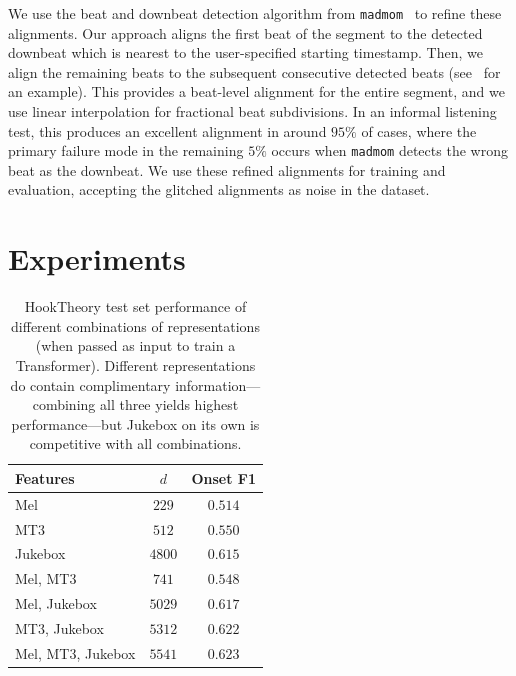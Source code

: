 \documentclass{article}
\newcommand{\madmom}{\texttt{madmom}}
\newcommand{\mel}{Mel}
\newcommand{\mtthree}{MT3}
\newcommand{\jukebox}{Jukebox}
\newcommand{\hooktheory}{HookTheory}
\newcommand{\fone}{F1}
\begin{document}
We use the beat and downbeat detection algorithm from \madmom{}~\cite{bock2016joint,bock2016madmom} to refine these alignments. 
Our approach aligns the first beat of the segment to the detected downbeat which is nearest to the user-specified starting timestamp. 
Then, we align the remaining beats to the subsequent consecutive detected beats (see~ for an example). 
This provides a beat-level alignment for the entire segment, and we use linear interpolation for fractional beat subdivisions. 
In an informal listening test, this produces an excellent alignment in around $95\%$ of cases, where the primary failure mode in the remaining $5\%$ occurs when \madmom{} detects the wrong beat as the downbeat. 
We use these refined alignments for training and evaluation, accepting the glitched alignments as noise in the dataset.

\section{Experiments}

\begin{table}[]
    \centering
    \begin{tabular}{lcc}
\toprule
Features & $d$ & Onset \fone{} \\
\midrule
\mel{} & $229$ & $0.514$ \\
\mtthree{} & $512$ & $0.550$ \\
\jukebox{} & $4800$ & $0.615$ \\
\mel{}, \mtthree{} & $741$ & $0.548$ \\
\mel{}, \jukebox{} & $5029$ & $0.617$ \\
\mtthree{}, \jukebox{} & $5312$ & $0.622$ \\
\mel{}, \mtthree{}, \jukebox{} & $5541$ & $\mathbf{0.623}$ \\
\bottomrule
    \end{tabular}
    \caption{\hooktheory{} test set performance of different combinations of representations (when passed as input to train a Transformer). Different representations do contain complimentary information---combining all three yields highest performance---but Jukebox on its own is competitive with all combinations.}
    \label{tab:hooktheory_test}
\end{table}
\end{document}
